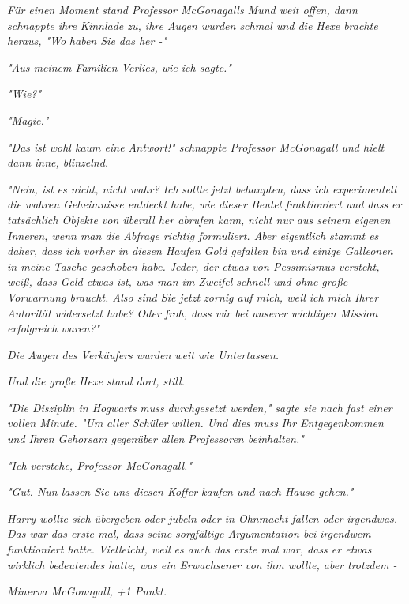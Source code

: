 {\emph{Für einen Moment stand Professor McGonagalls Mund weit offen, dann schnappte ihre Kinnlade zu, ihre Augen wurden schmal und die Hexe brachte heraus, "\emph{Wo}} \emph{haben Sie das her -"}

\emph{"Aus meinem Familien-Verlies, wie ich sagte."}

\emph{"\emph{Wie?}"}

\emph{"Magie."}

\emph{"Das ist wohl kaum eine Antwort!" schnappte Professor McGonagall und hielt dann inne, blinzelnd.}

\emph{"Nein, ist es nicht, nicht wahr? Ich} \emph{\emph{sollte}} \emph{jetzt behaupten, dass ich experimentell die wahren Geheimnisse entdeckt habe, wie dieser Beutel funktioniert und dass er tatsächlich Objekte von überall her abrufen kann,} \emph{nicht nur aus seinem eigenen Inneren, wenn man die Abfrage richtig formuliert. Aber eigentlich stammt es daher, dass ich vorher in diesen Haufen Gold gefallen bin und einige Galleonen in meine Tasche geschoben habe. Jeder, der etwas von Pessimismus versteht, weiß, dass Geld etwas ist, was man im Zweifel schnell und ohne große Vorwarnung braucht. Also sind Sie jetzt zornig auf mich, weil ich mich Ihrer Autorität widersetzt habe? Oder froh, dass wir bei unserer wichtigen Mission erfolgreich waren?"}

\emph{Die Augen des Verkäufers wurden weit wie Untertassen.}

\emph{Und die große Hexe stand dort, still.}

\emph{"Die Disziplin in Hogwarts} \emph{\emph{muss}} \emph{durchgesetzt werden," sagte sie nach fast einer vollen Minute. "Um} \emph{\emph{aller}} \emph{Schüler willen. Und dies} \emph{\emph{muss}} \emph{Ihr Entgegenkommen und Ihren Gehorsam gegenüber} \emph{\emph{allen}} \emph{Professoren beinhalten."}

\emph{"Ich verstehe, Professor McGonagall."}

\emph{"Gut. Nun lassen Sie uns diesen Koffer kaufen und nach Hause gehen."}

\emph{Harry wollte sich übergeben oder jubeln oder in Ohnmacht fallen oder} \emph{\emph{irgendwas.}} \emph{Das war das erste mal, dass seine sorgfältige Argumentation bei} \emph{\emph{irgendwem}} \emph{funktioniert hatte. Vielleicht, weil es auch das erste mal war, dass er etwas wirklich bedeutendes hatte, was ein Erwachsener von ihm wollte, aber trotzdem -}

\emph{Minerva McGonagall, +1 Punkt.}

}
